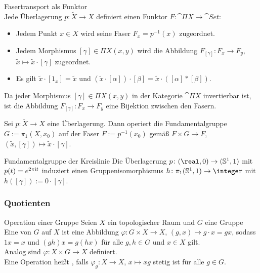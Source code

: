 \begin{Satz}{Fasertransport als Funktor}\\
    Jede Überlagerung $p\colon \widetilde{X} \rightarrow X$ definiert einen
    Funktor $F\colon \cat{\Pi X} \rightarrow \cat{Set}$:
    \begin{itemize}
        \item
        Jedem Punkt $x \in X$ wird seine Faser $F_x = p^{-1}(x)$ zugeordnet.

        \item
        Jedem Morphismus $[\gamma] \in \Pi X(x, y)$ wird die Abbildung
        $F_{[\gamma]}\colon F_x \rightarrow F_y$,
        $\widetilde{x} \mapsto \widetilde{x} \cdot [\gamma]$ zugeordnet.

        \item
        Es gilt $\widetilde{x} \cdot [1_x] = \widetilde{x}$ und
        $(\widetilde{x} \cdot [\alpha]) \cdot [\beta] =
        \widetilde{x} \cdot ([\alpha] \ast [\beta])$.
    \end{itemize}
    Da jeder Morphismus $[\gamma] \in \Pi X(x, y)$ in der Kategorie
    $\cat{\Pi X}$ invertierbar ist, ist die Abbildung
    $F_{[\gamma]}\colon F_x \rightarrow F_y$
    eine Bijektion zwischen den Fasern.
\end{Satz}

\begin{Kor}
    Sei $p\colon \widetilde{X} \rightarrow X$ eine Überlagerung.
    Dann operiert die Fundamentalgruppe \\
    $G := \pi_1(X, x_0)$ auf der
    Faser $F := p^{-1}(x_0)$ gemäß $F \times G \rightarrow F$,
    $(\widetilde{x}, [\gamma]) \mapsto \widetilde{x} \cdot [\gamma]$.
\end{Kor}

\linie

\begin{Satz}{Fundamentalgruppe der Kreislinie}
    Die Überlagerung $p\colon (\real, 0) \rightarrow (\sphere^1, 1)$ mit
    $p(t) = e^{2\pi\mathrm{i} t}$ induziert einen Gruppenisomorphismus
    $h\colon \pi_1(\sphere^1, 1) \rightarrow \integer$ mit
    $h([\gamma]) := 0 \cdot [\gamma]$.
\end{Satz}

\pagebreak

\subsubsection{%
    Quotienten%
}

\begin{Def}{Operation einer Gruppe}
    Seien $X$ ein topologischer Raum und $G$ eine Gruppe
    Eine  von $G$ auf $X$ ist eine Abbildung
    $\varphi\colon G \times X \rightarrow X$, $(g, x) \mapsto g \cdot x = gx$,
    sodass $1x = x$ und $(gh)x = g(hx)$ für alle $g, h \in G$ und $x \in X$
    gilt. \\
    Analog sind 
    $\varphi\colon X \times G \rightarrow X$ definiert. \\
    Eine Operation heißt , falls
    $\varphi_g\colon X \rightarrow X$, $x \mapsto xg$ stetig ist
    für alle $g \in G$.
\end{Def}


